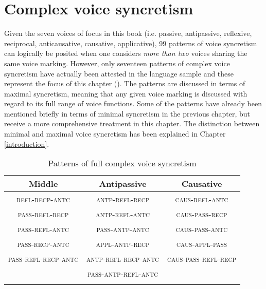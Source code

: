 \chapter{Complex voice syncretism} \label{sec:complex-syncretism}
Given the seven voices of focus in this book (i.e. passive, antipassive, reflexive, reciprocal, anticausative, causative, applicative), 99 patterns of voice syncretism can logically be posited when one considers \textit{more than two} voices sharing the same voice marking. However, only seventeen patterns of complex voice syncretism have actually been attested in the language sample and these represent the focus of this chapter (). The patterns are discussed in terms of maximal syncretism, meaning that any given voice marking is discussed with regard to its full range of voice functions. Some of the patterns have already been mentioned briefly in terms of minimal syncretism in the previous chapter, but receive a more comprehensive treatment in this chapter. The distinction between minimal and maximal voice syncretism has been explained in Chapter \ref{introduction}.

\begin{table}
	\begin{tabularx}{.92\textwidth}{ccc}
		\lsptoprule
		Middle & Antipassive & Causative \\
		\midrule
		\textsc{refl-recp-antc} & \textsc{antp-refl-recp} & \textsc{caus-refl-antc} \\
		\textsc{pass-refl-recp} & \textsc{antp-refl-antc} & \textsc{caus-pass-recp} \\
		\textsc{pass-refl-antc} & \textsc{pass-antp-antc} & \textsc{caus-pass-antc} \\
		\textsc{pass-recp-antc} & \textsc{appl-antp-recp} & \textsc{caus-appl-pass} \\
		\textsc{pass-refl-recp-antc} & \textsc{antp-refl-recp-antc} & \textsc{caus-pass-refl-recp} \\
		& \textsc{pass-antp-refl-antc} & \\
		\lspbottomrule
	\end{tabularx}
	\caption{Patterns of full complex voice syncretism}
	\label{tab:ch5:complex-patterns}
\end{table} 

